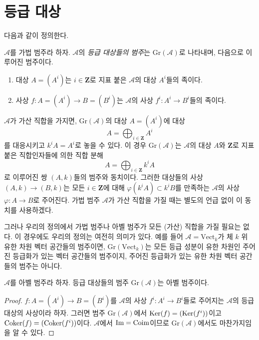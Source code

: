 \section{등급 대상}
\label{section-graded}

\noindent
다음과 같이 정의한다.

\begin{definition}
\label{definition-graded}
$\mathcal{A}$를 가법 범주라 하자.
$\mathcal{A}$의 {\it 등급 대상들의 범주}는
$\text{Gr}(\mathcal{A})$로 나타내며, 다음으로 이루어진 범주이다.
\begin{enumerate}
\item 대상 $A = (A^i)$는 $i \in \mathbf{Z}$로 지표 붙은
$\mathcal{A}$의 대상 $A^i$들의 족이다.
\item 사상 $f : A = (A^i) \to B = (B^i)$는 $\mathcal{A}$의 사상
$f^i : A^i \to B^i$들의 족이다.
\end{enumerate}
\end{definition}

\noindent
$\mathcal{A}$가 가산 직합을 가지면, $\text{Gr}(\mathcal{A})$의 대상
$A = (A^i)$에 대상
$$
A = \bigoplus\nolimits_{i \in \mathbf{Z}} A^i
$$
를 대응시키고 $k^iA = A^i$로 놓을 수 있다.
이 경우 $\text{Gr}(\mathcal{A})$는 $\mathcal{A}$의 대상 $A$와
$\mathbf{Z}$로 지표 붙은 직합인자들에 의한 직합 분해
$$
A = \bigoplus\nolimits_{i \in \mathbf{Z}} k^iA
$$
로 이루어진 쌍 $(A, k)$들의 범주와 동치이다.
그러한 대상들의 사상 $(A, k) \to (B, k)$는 모든
$i \in \mathbf{Z}$에 대해 $\varphi(k^iA) \subset k^iB$를 만족하는
$\mathcal{A}$의 사상 $\varphi : A \to B$로 주어진다.
가법 범주 $\mathcal{A}$가 가산 직합을 가질 때는 별도의 언급 없이
이 동치를 사용하겠다.

\medskip\noindent
그러나 우리의 정의에서 가법 범주나 아벨 범주가 모든 (가산) 직합을
가질 필요는 없다. 이 경우에도 우리의 정의는 여전히 의미가 있다.
예를 들어 $\mathcal{A} = \text{Vect}_k$가 체 $k$ 위 유한 차원 벡터
공간들의 범주이면, $\text{Gr}(\text{Vect}_k)$는 모든 등급 성분이
유한 차원인 주어진 등급화가 있는 벡터 공간들의 범주이지, 주어진
등급화가 있는 유한 차원 벡터 공간들의 범주는 아니다.

\begin{lemma}
\label{lemma-graded}
$\mathcal{A}$를 아벨 범주라 하자. 등급 대상들의 범주
$\text{Gr}(\mathcal{A})$는 아벨 범주이다.
\end{lemma}

\begin{proof}
$f : A = (A^i) \to B = (B^i)$를 $\mathcal{A}$의 사상
$f^i : A^i \to B^i$들로 주어지는 $\mathcal{A}$의 등급 대상의
사상이라 하자. 그러면 범주 $\text{Gr}(\mathcal{A})$에서
$\mathop{\mathrm{Ker}}(f) = (\mathop{\mathrm{Ker}}(f^i))$이고 $\mathop{\mathrm{Coker}}(f) = (\mathop{\mathrm{Coker}}(f^i))$이다.
$\mathcal{A}$에서 $\mathop{\mathrm{Im}} = \mathop{\mathrm{Coim}}$이므로
$\text{Gr}(\mathcal{A})$에서도 마찬가지임을 알 수 있다.
\end{proof}

